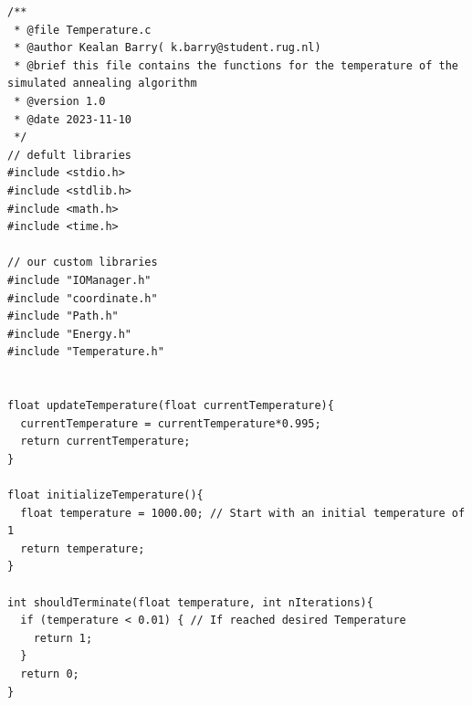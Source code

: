 \documentclass[a4paper,10pt]{article}
\begin{document}
\begin{lstlisting}[style = code, title = Temperature.c]
/**
 * @file Temperature.c
 * @author Kealan Barry( k.barry@student.rug.nl)
 * @brief this file contains the functions for the temperature of the simulated annealing algorithm 
 * @version 1.0
 * @date 2023-11-10
 */
// defult libraries 
#include <stdio.h>
#include <stdlib.h>
#include <math.h>
#include <time.h>

// our custom libraries
#include "IOManager.h"
#include "coordinate.h"
#include "Path.h"
#include "Energy.h"
#include "Temperature.h"


float updateTemperature(float currentTemperature){
  currentTemperature = currentTemperature*0.995;
  return currentTemperature;
}

float initializeTemperature(){
  float temperature = 1000.00; // Start with an initial temperature of 1
  return temperature;
}

int shouldTerminate(float temperature, int nIterations){
  if (temperature < 0.01) { // If reached desired Temperature
    return 1;
  }
  return 0;
}
\end{lstlisting}
\end{document}
